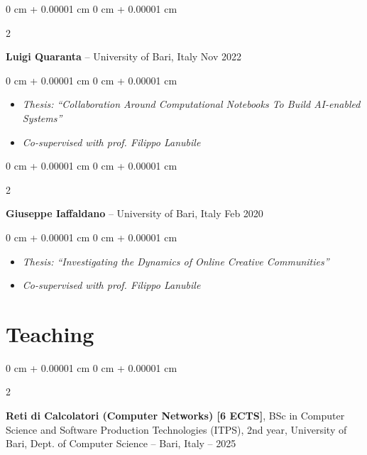 \documentclass[10pt, a4paper]{article}
\newenvironment{highlights}{
    \begin{itemize}[
        topsep=0.10 cm,
        parsep=0.10 cm,
        partopsep=0pt,
        itemsep=0pt,
        leftmargin=0 cm + 10pt
    ]
}{
    \end{itemize}
} %
\newenvironment{onecolentry}{
    \begin{adjustwidth}{
        0 cm + 0.00001 cm
    }{
        0 cm + 0.00001 cm
    }
}{
    \end{adjustwidth}
} %
\newenvironment{twocolentry}[2][]{
    \onecolentry
    \def\secondColumn{#2}
    \setcolumnwidth{\fill, 4.5 cm}
    \begin{paracol}{2}
}{
    \switchcolumn \raggedleft \secondColumn
    \end{paracol}
    \endonecolentry
} %
\begin{document}
        \vspace{0.2 cm}

        \begin{twocolentry}{
            Nov 2022
        }
            \textbf{Luigi Quaranta} -- University of Bari, Italy\end{twocolentry}

        \vspace{0.10 cm}
        \begin{onecolentry}
            \begin{highlights}
                \item \textit{Thesis: ``Collaboration Around Computational Notebooks To Build AI-enabled Systems''}
                \item \textit{Co-supervised with prof. Filippo Lanubile}
            \end{highlights}
        \end{onecolentry}


        \vspace{0.2 cm}

        \begin{twocolentry}{
            Feb 2020
        }
            \textbf{Giuseppe Iaffaldano} -- University of Bari, Italy\end{twocolentry}

        \vspace{0.10 cm}
        \begin{onecolentry}
            \begin{highlights}
                \item \textit{Thesis: ``Investigating the Dynamics of Online Creative Communities''}
                \item \textit{Co-supervised with prof. Filippo Lanubile}
            \end{highlights}
        \end{onecolentry}



    
    \section{Teaching}



        
        \begin{twocolentry}{
            2022 – 2025
        }
            \textbf{Reti di Calcolatori (Computer Networks) [6 ECTS]}, BSc in Computer Science and Software Production Technologies (ITPS), 2nd year, University of Bari, Dept. of Computer Science -- Bari, Italy\end{twocolentry}
\end{document}
